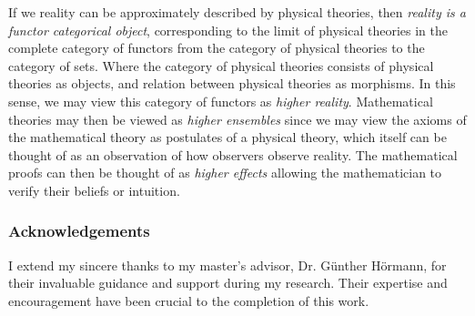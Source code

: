 \documentclass[11pt]{article}
\begin{document}
\noindent If we reality can be approximately described by physical theories, then \emph{reality is a functor categorical object}, corresponding to the limit of physical theories in the complete category of functors from the category of physical theories to the category of sets. Where the category of physical theories consists of physical theories as objects, and relation between physical theories as morphisms. In this sense, we may view this category of functors as \emph{higher reality}. Mathematical theories may then be viewed as \emph{higher ensembles} since we may view the axioms of the mathematical theory as postulates of a physical theory, which itself can be thought of as an observation of how observers observe reality. The mathematical proofs can then be thought of as \emph{higher effects} allowing the mathematician to verify their beliefs or intuition.

\subsubsection*{Acknowledgements}
I extend my sincere thanks to my master's advisor, Dr. G\"unther H\"ormann, for their invaluable guidance and support during my research. Their expertise and encouragement have been crucial to the completion of this work.
\end{document}
